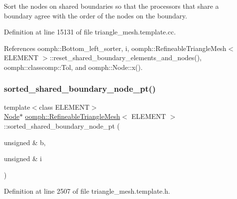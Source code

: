 Sort the nodes on shared boundaries so that the processors that share a boundary agree with the order of the nodes on the boundary. 



Definition at line 15131 of file triangle\+\_\+mesh.\+template.\+cc.



References oomph\+::\+Bottom\+\_\+left\+\_\+sorter, i, oomph\+::\+Refineable\+Triangle\+Mesh$<$ E\+L\+E\+M\+E\+N\+T $>$\+::reset\+\_\+shared\+\_\+boundary\+\_\+elements\+\_\+and\+\_\+nodes(), oomph\+::classcomp\+::\+Tol, and oomph\+::\+Node\+::x().

\mbox{\label{classoomph_1_1RefineableTriangleMesh_a83d026092113ef41bd74e4d73928ebef}} 
\subsubsection{\texorpdfstring{sorted\+\_\+shared\+\_\+boundary\+\_\+node\+\_\+pt()}{sorted\_shared\_boundary\_node\_pt()}\hspace{0.1cm}{\footnotesize\ttfamily [1/2]}}
{\footnotesize\ttfamily template$<$class E\+L\+E\+M\+E\+NT$>$ \\
\hyperlink{classoomph_1_1Node}{Node}$\ast$ \hyperlink{classoomph_1_1RefineableTriangleMesh}{oomph\+::\+Refineable\+Triangle\+Mesh}$<$ E\+L\+E\+M\+E\+NT $>$\+::sorted\+\_\+shared\+\_\+boundary\+\_\+node\+\_\+pt (\begin{DoxyParamCaption}\item[{unsigned \&}]{b,  }\item[{unsigned \&}]{i }\end{DoxyParamCaption})\hspace{0.3cm}{\ttfamily [inline]}}



Definition at line 2507 of file triangle\+\_\+mesh.\+template.\+h.

\mbox{\label{classoomph_1_1RefineableTriangleMesh_a99f0a509d5e79e97129a6aa66644f0b7}} 
